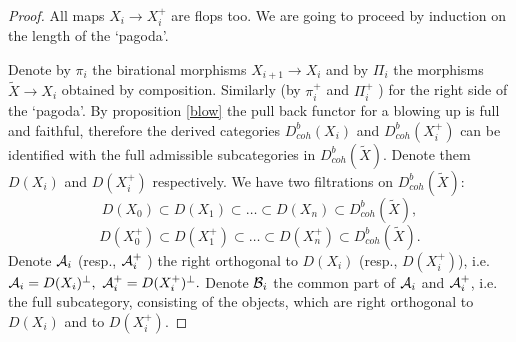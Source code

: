 \documentclass[12pt]{article}
\begin{document}
\begin{proof}
All maps $X_i\longrightarrow X_i^+$ are flops too. We are going to proceed by induction on the length of the `pagoda'.

Denote by $\pi_i$ the birational morphisms $X_{i+1}\longrightarrow X_i$ and by $\Pi_i$ the morphisms $\widetilde X\longrightarrow X_i$ obtained by composition. Similarly (by $\pi^+_i$ and $\Pi^+_i$ ) for the right side of the `pagoda'. By proposition \ref{blow} the pull back functor for a blowing up is full and faithful, therefore the derived categories $D^b_{coh}(X_i)$ and $D^b_{coh}(X^+_i)$ can be identified with the full admissible subcategories in $D^b_{coh}(\widetilde X)$. Denote them $D(X_i)$ and $D(X^+_i)$ respectively. We have two filtrations on $D^b_{coh}(\widetilde X)$:
$$D(X_0)\subset D(X_1)\subset\ldots \subset D(X_n)\subset
D^b_{coh}(\widetilde X),$$
$$D(X^+_0)\subset D(X^+_1)\subset\ldots \subset D(X^+_n)\subset
D^b_{coh}(\widetilde X).$$
Denote ${\cal A}_i$ (resp.,
${\cal A}^+_i$  ) the right orthogonal to $D(X_i)$ (resp.,
$D(X^+_i)$), i.e. ${\cal A}_i=D(X_i)^{\bot},\
{\cal A}^+_i=D(X^+_i)^{\bot}.$
Denote ${\cal B}_i$ the common part of ${\cal A}_i$ and
${\cal A}^+_i $, i.e. the full subcategory, consisting of the objects, which are right orthogonal to $D(X_i)$ and to
$D(X^+_i)$.
\end{proof}
\end{document}
